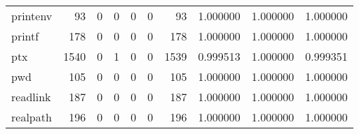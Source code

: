\begin{tabular}{lrrrrrrrrr}
printenv  &                                                 93 &                                                  0 &                                                  0 &                                                  0 &                                                  0 &                                                 93 &                                           1.000000 &                               1.000000 &                             1.000000 \\
printf    &                                                178 &                                                  0 &                                                  0 &                                                  0 &                                                  0 &                                                178 &                                           1.000000 &                               1.000000 &                             1.000000 \\
ptx       &                                               1540 &                                                  0 &                                                  1 &                                                  0 &                                                  0 &                                               1539 &                                           0.999513 &                               1.000000 &                             0.999351 \\
pwd       &                                                105 &                                                  0 &                                                  0 &                                                  0 &                                                  0 &                                                105 &                                           1.000000 &                               1.000000 &                             1.000000 \\
readlink  &                                                187 &                                                  0 &                                                  0 &                                                  0 &                                                  0 &                                                187 &                                           1.000000 &                               1.000000 &                             1.000000 \\
realpath  &                                                196 &                                                  0 &                                                  0 &                                                  0 &                                                  0 &                                                196 &                                           1.000000 &                               1.000000 &                             1.000000 \\

\end{tabular}
